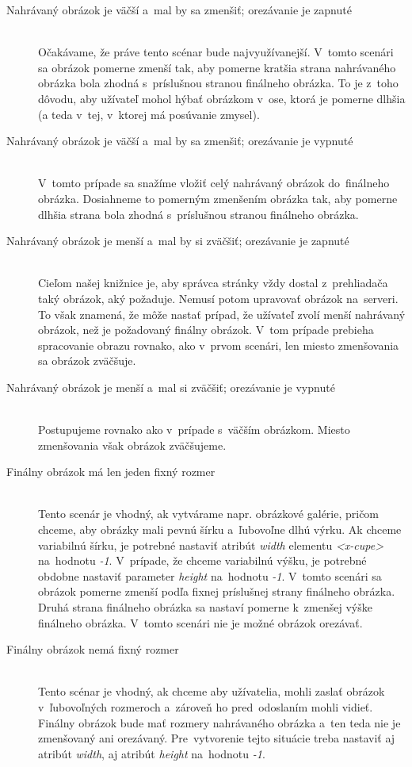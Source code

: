 \begin{description}
	\item[Nahrávaný obrázok je väčší a~mal by sa zmenšiť; orezávanie je zapnuté] \hfill \\
	Očakávame, že práve tento scénar bude najvyužívanejší. V~tomto scenári sa obrázok pomerne zmenší tak, aby pomerne kratšia strana nahrávaného obrázka bola zhodná s~príslušnou stranou finálneho obrázka. To je z~toho dôvodu, aby užívateľ mohol hýbať obrázkom v~ose, ktorá je pomerne dlhšia (a teda v~tej, v~ktorej má posúvanie zmysel).
	\item[Nahrávaný obrázok je väčší a~mal by sa zmenšiť; orezávanie je vypnuté] \hfill \\
	V~tomto prípade sa snažíme vložiť celý nahrávaný obrázok do~finálneho obrázka. Dosiahneme to pomerným zmenšením obrázka tak, aby pomerne dlhšia strana bola zhodná s~príslušnou stranou finálneho obrázka.
	\item[Nahrávaný obrázok je menší a~mal by si zväčšiť; orezávanie je zapnuté] \hfill \\
	Cieľom našej knižnice je, aby správca stránky vždy dostal z~prehliadača taký obrázok, aký požaduje. Nemusí potom upravovať obrázok na~serveri. To však znamená, že môže nastať prípad, že užívateľ zvolí menší nahrávaný obrázok, než je požadovaný finálny obrázok. V~tom prípade prebieha spracovanie obrazu rovnako, ako v~prvom scenári, len miesto zmenšovania sa obrázok zväčšuje.
	\item[Nahrávaný obrázok je menší a~mal si zväčšiť; orezávanie je vypnuté] \hfill \\
	Postupujeme rovnako ako v~prípade s~väčším obrázkom. Miesto zmenšovania však obrázok zväčšujeme.
	\item[Finálny obrázok má len jeden fixný rozmer] \hfill \\
	Tento scenár je vhodný, ak vytvárame napr. obrázkové galérie, pričom chceme, aby obrázky mali pevnú šírku a~ľubovoľne dlhú výrku. Ak chceme variabilnú šírku, je potrebné nastaviť atribút \emph{width} elementu \emph{<x-cupe>} na~hodnotu \emph{-1}. V~prípade, že chceme variabilnú výšku, je potrebné obdobne nastaviť parameter \emph{height} na~hodnotu \emph{-1}. V~tomto scenári sa obrázok pomerne zmenší podľa fixnej príslušnej strany finálneho obrázka. Druhá strana finálneho obrázka sa nastaví pomerne k~zmenšej výške finálneho obrázka. V~tomto scenári nie je možné obrázok orezávať.
	\item[Finálny obrázok nemá fixný rozmer] \hfill \\
	Tento scénar je vhodný, ak chceme aby užívatelia, mohli zaslať obrázok v~ľubovoľných rozmeroch a~zároveň ho pred~odoslaním mohli vidieť. Finálny obrázok bude mať rozmery nahrávaného obrázka a~ten teda nie je zmenšovaný ani orezávaný. Pre~vytvorenie tejto situácie treba nastaviť aj atribút \emph{width}, aj atribút \emph{height} na~hodnotu \emph{-1}.
	
\end{description}


